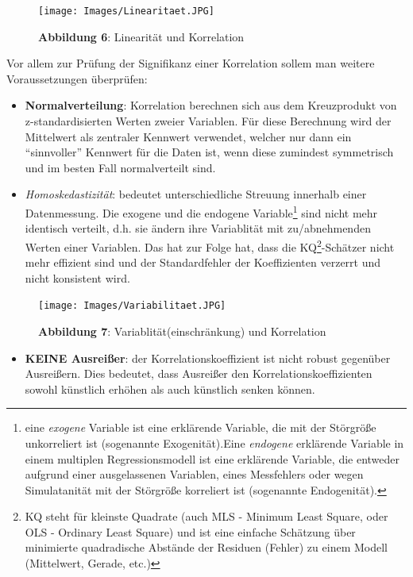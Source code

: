 \documentclass[]{article}
\providecommand{\tightlist}{%
  \setlength{\itemsep}{0pt}\setlength{\parskip}{0pt}}
\let\rmarkdownfootnote\footnote%
\def\footnote{\protect\rmarkdownfootnote}
\begin{document}
\begin{figure}
\centering
\texttt{[image: Images/Linearitaet.JPG]}
\caption{\textbf{Abbildung 6}: Linearität und Korrelation}
\end{figure}

Vor allem zur Prüfung der Signifikanz einer Korrelation sollem man weitere Voraussetzungen überprüfen:

\begin{itemize}
\item
  \textbf{Normalverteilung}: Korrelation berechnen sich aus dem Kreuzprodukt von z-standardisierten Werten zweier Variablen. Für diese Berechnung wird der Mittelwert als zentraler Kennwert verwendet, welcher nur dann ein ``sinnvoller'' Kennwert für die Daten ist, wenn diese zumindest symmetrisch und im besten Fall normalverteilt sind.
\item
  \emph{Homoskedastizität}: bedeutet unterschiedliche Streuung innerhalb einer Datenmessung. Die exogene und die endogene Variable\footnote{eine \emph{exogene} Variable ist eine erklärende Variable, die mit der Störgröße unkorreliert ist (sogenannte Exogenität).Eine \emph{endogene} erklärende Variable in einem multiplen Regressionsmodell ist eine erklärende Variable, die entweder aufgrund einer ausgelassenen Variablen, eines Messfehlers oder wegen Simulatanität mit der Störgröße korreliert ist (sogenannte Endogenität).} sind nicht mehr identisch verteilt, d.h. sie ändern ihre Variablität mit zu/abnehmenden Werten einer Variablen. Das hat zur Folge hat, dass die KQ\footnote{KQ steht für kleinste Quadrate (auch MLS - Minimum Least Square, oder OLS - Ordinary Least Square) und ist eine einfache Schätzung über minimierte quadradische Abstände der Residuen (Fehler) zu einem Modell (Mittelwert, Gerade, etc.)}-Schätzer nicht mehr effizient sind und der Standardfehler der Koeffizienten verzerrt und nicht konsistent wird.
\end{itemize}

\begin{figure}
\centering
\texttt{[image: Images/Variabilitaet.JPG]}
\caption{\textbf{Abbildung 7}: Variablität(einschränkung) und Korrelation}
\end{figure}

\begin{itemize}
\tightlist
\item
  \textbf{KEINE Ausreißer}: der Korrelationskoeffizient ist nicht robust gegenüber Ausreißern. Dies bedeutet, dass Ausreißer den Korrelationskoeffizienten sowohl künstlich erhöhen als auch künstlich senken können.
\end{itemize}
\end{document}
